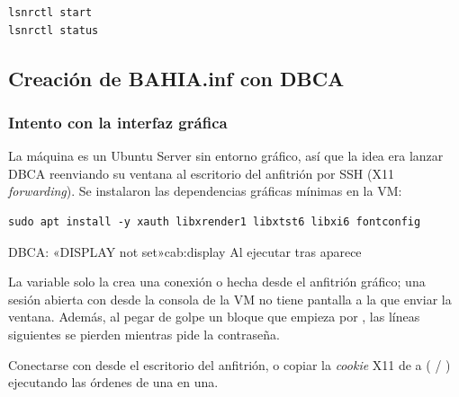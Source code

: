 \begin{lstlisting}[style=bash]
lsnrctl start
lsnrctl status
\end{lstlisting}


\subsection{Creación de BAHIA.inf con DBCA}
\label{sec:dbca}

\subsubsection{Intento con la interfaz gráfica}

La máquina es un Ubuntu Server sin entorno gráfico, así que la idea era lanzar
DBCA reenviando su ventana al escritorio del anfitrión por SSH (X11
\emph{forwarding}). Se instalaron las dependencias gráficas mínimas en la VM:

\begin{lstlisting}[style=bash]
sudo apt install -y xauth libxrender1 libxtst6 libxi6 fontconfig
\end{lstlisting}


\begin{cabezazo}{DBCA: «DISPLAY not set»}{cab:display}
\problema Al ejecutar  tras  aparece

\causa La variable  solo la crea una conexión  o
 hecha desde el anfitrión gráfico; una sesión abierta con
 desde la consola de la VM no tiene pantalla a la que enviar la
ventana. Además, al pegar de golpe un bloque que empieza por
, las líneas siguientes se pierden mientras 
pide la contraseña.

\solucion Conectarse con  desde el escritorio
del anfitrión, o copiar la \emph{cookie} X11 de  a 
( / ) ejecutando las órdenes de una
en una.
\end{cabezazo}

